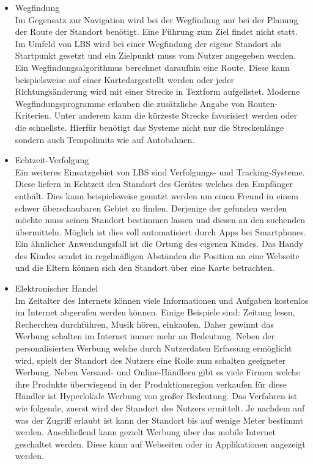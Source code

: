\begin{itemize}
	\item Wegfindung\\
Im Gegensatz zur Navigation wird bei der Wegfindung nur bei der Planung der Route der Standort benötigt. Eine Führung zum Ziel findet nicht statt. Im Umfeld von LBS wird bei einer Wegfindung der eigene Standort als Startpunkt gesetzt und ein Zielpunkt muss vom Nutzer angegeben werden. Ein Wegfindungsalgorithmus berechnet daraufhin eine Route. Diese kann beispielsweise auf einer Kartedargestellt werden oder jeder Richtungsänderung wird mit einer Strecke in Textform aufgelistet. Moderne Wegfindungsprogramme erlauben die zusätzliche Angabe von Routen- Kriterien. Unter anderem kann die kürzeste Strecke favorisiert werden oder die schnellste.  Hierfür benötigt das Systeme nicht nur die Streckenlänge sondern auch Tempolimits wie auf Autobahnen. 
	\item Echtzeit-Verfolgung\\
Ein weiteres Einsatzgebiet von LBS sind Verfolgungs- und Tracking-Systeme. Diese liefern in Echtzeit den Standort des Gerätes welches den Empfänger enthält. Dies kann beispielsweise genutzt werden um einen Freund in einem schwer überschaubaren Gebiet zu finden. Derjenige der gefunden werden möchte muss seinen Standort bestimmen lassen und diesen an den suchenden übermitteln. Möglich ist dies voll automatisiert durch Apps bei Smartphones. Ein ähnlicher Anwendungsfall ist die Ortung des eigenen Kindes. Das Handy des Kindes sendet in regelmäßigen Abständen die Position an eine Webseite und die Eltern können sich den Standort über eine Karte betrachten.\cite{FreundeFinden} \cite{KiFinden} 
	\item Elektronischer Handel\\
Im Zeitalter des Internets können viele Informationen und Aufgaben kostenlos im Internet abgerufen werden können. Einige Beispiele sind: Zeitung lesen, Recherchen durchführen, Musik hören, einkaufen. Daher gewinnt das Werbung schalten im Internet immer mehr an Bedeutung. Neben der personalisierten Werbung welche durch Nutzerdaten Erfassung ermöglicht wird, spielt der Standort des Nutzers eine Rolle zum schalten geeigneter Werbung. Neben Versand- und Online-Händlern gibt es viele Firmen welche ihre Produkte überwiegend in der Produktionsregion verkaufen für diese Händler ist Hyperlokale Werbung von großer Bedeutung. Das Verfahren ist wie folgende, zuerst wird der Standort des Nutzers ermittelt. Je nachdem auf was der Zugriff erlaubt ist kann der Standort bis auf wenige Meter bestimmt werden. Anschließend kann gezielt Werbung über das mobile Internet geschaltet werden. Diese kann auf Webseiten oder in Applikationen angezeigt werden. \cite{HyperWerbung} \cite{Adwords}

\end{itemize}
